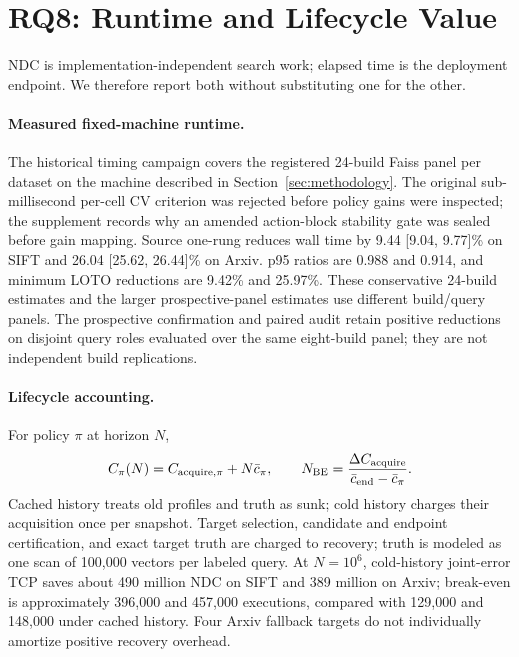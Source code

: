 \section{RQ8: Runtime and Lifecycle Value}
\label{sec:economics}

NDC is implementation-independent search work; elapsed time is the deployment endpoint. We therefore report both without substituting one for the other.

\paragraph{Measured fixed-machine runtime.}
The historical timing campaign covers the registered 24-build Faiss panel per dataset on the machine described in Section~\ref{sec:methodology}. The original sub-millisecond per-cell CV criterion was rejected before policy gains were inspected; the supplement records why an amended action-block stability gate was sealed before gain mapping. Source one-rung reduces wall time by 9.44 [9.04, 9.77]\% on SIFT and 26.04 [25.62, 26.44]\% on Arxiv. p95 ratios are 0.988 and 0.914, and minimum LOTO reductions are 9.42\% and 25.97\%. These conservative 24-build estimates and the larger prospective-panel estimates use different build/query panels. The prospective confirmation and paired audit retain positive reductions on disjoint query roles evaluated over the same eight-build panel; they are not independent build replications.

\paragraph{Lifecycle accounting.}
For policy $\pi$ at horizon $N$,
\begin{equation}
 C_\pi(N)=C_{{\rm acquire},\pi}+N\bar c_\pi,
 \qquad N_{\rm BE}=\frac{\Delta C_{\rm acquire}}{\bar c_{\rm end}-\bar c_\pi}.
 \label{eq:breakeven}
\end{equation}
Cached history treats old profiles and truth as sunk; cold history charges their acquisition once per snapshot. Target selection, candidate and endpoint certification, and exact target truth are charged to recovery; truth is modeled as one scan of 100,000 vectors per labeled query. At $N=10^6$, cold-history joint-error TCP saves about 490 million NDC on SIFT and 389 million on Arxiv; break-even is approximately 396,000 and 457,000 executions, compared with 129,000 and 148,000 under cached history. Four Arxiv fallback targets do not individually amortize positive recovery overhead.

